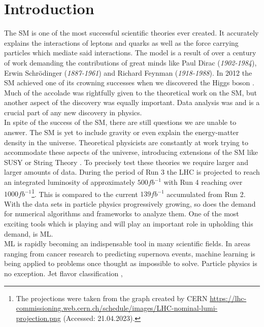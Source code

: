 \chapter*{Introduction}
The \ac{SM} is one of the most successful scientific theories ever
created. It accurately explains the interactions of leptons and quarks as well as the force
carrying particles which mediate said interactions. The model is a result of over a century of work
demanding the contributions of great minds like Paul Dirac (\emph{1902-1984}), Erwin Schrödinger (\emph{1887-1961}) and Richard Feynman (\emph{1918-1988}).
In 2012 the \ac{SM} achieved one of its crowning successes when we discovered the Higgs boson \cite{Aad_2012,the_cms_collaboration_observation_2012}. 
Much of the accolade was rightfully given to the theoretical work on the \ac{SM}, but another aspect of the discovery 
was equally important. Data analysis was and is a crucial part of any new discovery in physics. \newline
\\
In spite of the success of the \ac{SM}, there are still questions we are unable to answer.
The \ac{SM} is yet to include gravity or even explain the energy-matter density in the universe. Theoretical physicists 
are constantly at work trying to accommodate these aspects of the universe,
introducing extensions of the \ac{SM} like \ac{SUSY} \cite{SUSY} or String Theory \cite{cole_probing_2021}. To precisely test these theories
we require larger and larger amounts of data. During the period of Run 3 the \ac{LHC} is projected to reach an integrated luminosity of approximately  
$500fb^{-1}$ with Run 4 reaching over $1000fb^{-1}$\footnote{The projections were taken from the graph created by CERN
\url{https://lhc-commissioning.web.cern.ch/schedule/images/LHC-nominal-lumi-projection.png}
(Accessed: 21.04.2023).}. This is compared to the current $139fb^{-1}$ accumulated from Run 2. With the data sets in particle physics progressively growing, 
so does the demand for numerical algorithms and frameworks to analyze them. One of the most exciting tools which is playing and will play an important role in upholding 
this demand, is \acf{ML}.\newline
\\
\ac{ML} is rapidly becoming an indispensable tool in many scientific fields.
In areas ranging from cancer research to predicting supernova events, machine learning is being applied to problems
once thought as impossible to solve. Particle physics is no exception. Jet flavor classification \cite{Guest_2016}, 
